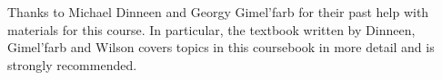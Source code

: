 \documentclass[11pt,oneside]{memoir}
\theoremstyle{definition}
\numberwithin{Lemma}{chapter}
\numberwithin{Exercise}{section}
\theoremstyle{remark}
\begin{document}
Thanks to Michael Dinneen and Georgy Gimel'farb for their past help with materials for this course. In particular, the textbook written by Dinneen, Gimel'farb and Wilson covers topics in this coursebook in more detail and is strongly recommended.

\clearpage
\tableofcontents

 











%
%
%
%



%

\printindex
\end{document}
